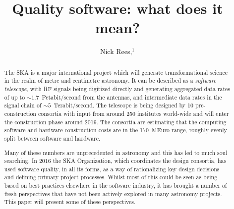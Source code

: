 \documentclass[11pt,twoside]{article}
\begin{document}
\title{Quality software: what does it mean?}

\author{Nick Rees,$^1$
}


\begin{abstract}
The SKA is a major international project which will generate transformational science in the realm of metre and centimetre astronomy. It can be described as a \emph{software telescope}, with RF signals being digitized directly and generating aggregated data rates of up to $\sim\!1.7$~Petabit/second from the antennas, and intermediate data rates in the signal chain of $\sim\!5$~Terabit/second. The telescope is being designed by 10 pre-construction consortia with input from around 250 institutes world-wide and will enter the construction phase around 2019. The consortia are estimating that the computing software and hardware construction costs are in the 170~MEuro range, roughly evenly split between software and hardware. 

Many of these numbers are unprecedented in astronomy and this has led to much soul searching. In 2016 the SKA Organization, which coordinates the design consortia, has used software quality, in all its forms, as a way of rationalizing key design decisions and defining primary project processes. Whilst most of this could be seen as being based on best practices elsewhere in the software industry, it has brought a number of fresh perspectives that have not been actively explored in many astronomy projects. This paper will present some of these perspectives.
\end{abstract}
\end{document}
